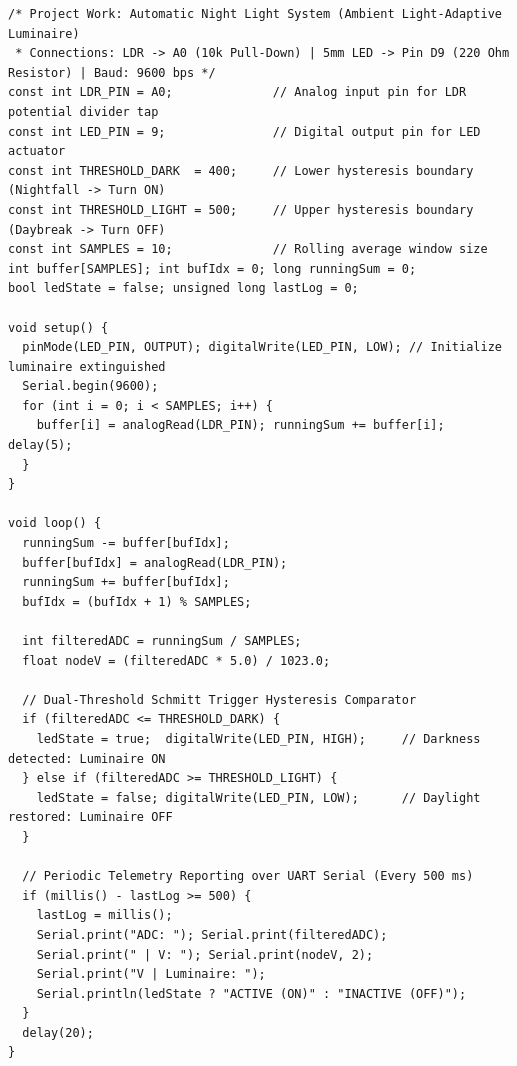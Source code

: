 \documentclass[10pt,a4paper]{article}
\begin{document}
\begin{lstlisting}[style=bwArduino, title={\textbf{Listing P.1: Production Firmware for Automatic Night Light with Moving-Average Filtering \& Hysteresis.}}]
/* Project Work: Automatic Night Light System (Ambient Light-Adaptive Luminaire)
 * Connections: LDR -> A0 (10k Pull-Down) | 5mm LED -> Pin D9 (220 Ohm Resistor) | Baud: 9600 bps */
const int LDR_PIN = A0;              // Analog input pin for LDR potential divider tap
const int LED_PIN = 9;               // Digital output pin for LED actuator
const int THRESHOLD_DARK  = 400;     // Lower hysteresis boundary (Nightfall -> Turn ON)
const int THRESHOLD_LIGHT = 500;     // Upper hysteresis boundary (Daybreak -> Turn OFF)
const int SAMPLES = 10;              // Rolling average window size
int buffer[SAMPLES]; int bufIdx = 0; long runningSum = 0;
bool ledState = false; unsigned long lastLog = 0;

void setup() {
  pinMode(LED_PIN, OUTPUT); digitalWrite(LED_PIN, LOW); // Initialize luminaire extinguished
  Serial.begin(9600);
  for (int i = 0; i < SAMPLES; i++) {
    buffer[i] = analogRead(LDR_PIN); runningSum += buffer[i]; delay(5);
  }
}

void loop() {
  runningSum -= buffer[bufIdx];
  buffer[bufIdx] = analogRead(LDR_PIN);
  runningSum += buffer[bufIdx];
  bufIdx = (bufIdx + 1) % SAMPLES;

  int filteredADC = runningSum / SAMPLES;
  float nodeV = (filteredADC * 5.0) / 1023.0;

  // Dual-Threshold Schmitt Trigger Hysteresis Comparator
  if (filteredADC <= THRESHOLD_DARK) {
    ledState = true;  digitalWrite(LED_PIN, HIGH);     // Darkness detected: Luminaire ON
  } else if (filteredADC >= THRESHOLD_LIGHT) {
    ledState = false; digitalWrite(LED_PIN, LOW);      // Daylight restored: Luminaire OFF
  }

  // Periodic Telemetry Reporting over UART Serial (Every 500 ms)
  if (millis() - lastLog >= 500) {
    lastLog = millis();
    Serial.print("ADC: "); Serial.print(filteredADC);
    Serial.print(" | V: "); Serial.print(nodeV, 2);
    Serial.print("V | Luminaire: ");
    Serial.println(ledState ? "ACTIVE (ON)" : "INACTIVE (OFF)");
  }
  delay(20);
}
\end{lstlisting}

\vspace{0.04cm}

\end{document}
